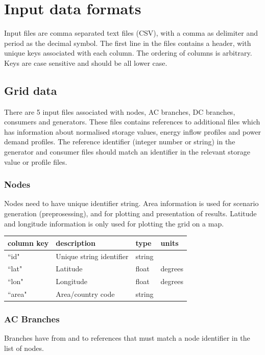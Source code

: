 \documentclass{article}
\begin{document}
\section{Input data formats}
Input files are comma separated text files (CSV), with a comma as delimiter and period as the decimal symbol. The first line in the files contains a header, with unique keys associated with each column. The ordering of columns is arbitrary. Keys are case sensitive and should be all lower case.

\subsection{Grid data}
There are 5 input files associated with nodes, AC branches, DC branches, consumers and generators. These files contains references to additional files which has information about normalised storage values, energy inflow profiles and power demand profiles. The reference identifier (integer number or string) in the generator and consumer files should match an identifier in the relevant storage value or profile files.

\subsubsection{Nodes}
Nodes need to have unique identifier string. Area information is used for scenario generation (preprosessing), and for plotting and presentation of results.
Latitude and longitude information is only used for plotting the grid on a map.

\medskip
\begin{tabular}{llll}
	\hline
	column key & description & type & units \\
	\hline
	``id"	&	Unique string identifier 	& string	& \\
	``lat"	&	Latitude				& float 	& degrees \\
	``lon"	&	Longitude				& float	& degrees \\
	``area" &	Area/country code		& string	& \\
	\hline
\end{tabular}


\subsubsection{AC Branches}
Branches have from and to references that must match a node identifier in the list of nodes.
\end{document}
